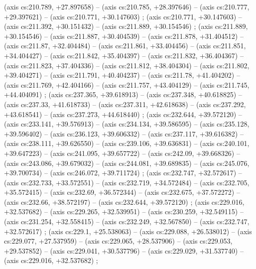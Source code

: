    (axis cs:210.789,    +27.897658) --  (axis cs:210.785,    +28.397646) --  (axis cs:210.777,    +29.397621) --  (axis cs:210.771,    +30.147603) ;
    (axis cs:210.771,    +30.147603) --  (axis cs:211.392,    +30.151432) --  (axis cs:211.889,    +30.154546) ;
    (axis cs:211.889,    +30.154546) --  (axis cs:211.887,    +30.404539) --  (axis cs:211.878,    +31.404512) --  (axis cs:211.87,    +32.404484) --  (axis cs:211.861,    +33.404456) --  (axis cs:211.851,    +34.404427) --  (axis cs:211.842,    +35.404397) --  (axis cs:211.832,    +36.404367) --  (axis cs:211.823,    +37.404336) --  (axis cs:211.812,    +38.404304) --  (axis cs:211.802,    +39.404271) --  (axis cs:211.791,    +40.404237) --  (axis cs:211.78,    +41.404202) --  (axis cs:211.769,    +42.404166) --  (axis cs:211.757,    +43.404129) --  (axis cs:211.745,    +44.404091) ;
    (axis cs:237.365,    +39.618913) --  (axis cs:237.348,    +40.618825) --  (axis cs:237.33,    +41.618733) --  (axis cs:237.311,    +42.618638) --  (axis cs:237.292,    +43.618541) --  (axis cs:237.273,    +44.618440) ;
    (axis cs:232.644,    +39.572120) --  (axis cs:233.141,    +39.576913) --  (axis cs:234.134,    +39.586595) --  (axis cs:235.128,    +39.596402) --  (axis cs:236.123,    +39.606332) --  (axis cs:237.117,    +39.616382) --  (axis cs:238.111,    +39.626550) --  (axis cs:239.106,    +39.636831) --  (axis cs:240.101,    +39.647223) --  (axis cs:241.095,    +39.657722) --  (axis cs:242.09,    +39.668326) --  (axis cs:243.086,    +39.679032) --  (axis cs:244.081,    +39.689835) --  (axis cs:245.076,    +39.700734) --  (axis cs:246.072,    +39.711724) ;
    (axis cs:232.747,    +32.572617) --  (axis cs:232.733,    +33.572551) --  (axis cs:232.719,    +34.572484) --  (axis cs:232.705,    +35.572415) --  (axis cs:232.69,    +36.572344) --  (axis cs:232.675,    +37.572272) --  (axis cs:232.66,    +38.572197) --  (axis cs:232.644,    +39.572120) ;
    (axis cs:229.016,    +32.537682) --  (axis cs:229.265,    +32.539951) --  (axis cs:230.259,    +32.549115) --  (axis cs:231.254,    +32.558415) --  (axis cs:232.249,    +32.567850) --  (axis cs:232.747,    +32.572617) ;
    (axis cs:229.1,    +25.538063) --  (axis cs:229.088,    +26.538012) --  (axis cs:229.077,    +27.537959) --  (axis cs:229.065,    +28.537906) --  (axis cs:229.053,    +29.537852) --  (axis cs:229.041,    +30.537796) --  (axis cs:229.029,    +31.537740) --  (axis cs:229.016,    +32.537682) ;

